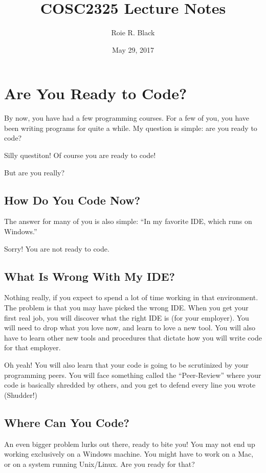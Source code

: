 \documentclass[letterpaper,11pt,english]{sphinxmanual}
\title{COSC2325 Lecture Notes}
\date{May 29, 2017}
\author{Roie R. Black}
\begin{document}
\maketitle
\sphinxtableofcontents
{}\label{\detokenize{index::doc}}



\chapter{Are You Ready to Code?}
\label{\detokenize{01_introduction/are-you-ready-to-code::doc}}
By now, you have had a few programming courses. For a few of you, you have
been writing programs for quite a while. My question is simple: are you ready
to code?

Silly questiton! Of course you are ready to code!

But are you really?


\section{How Do You Code Now?}
\label{\detokenize{01_introduction/are-you-ready-to-code:how-do-you-code-now}}
The answer for many of you is also simple: “In my favorite IDE, which runs on
Windows.”

Sorry! You are not ready to code.


\section{What Is Wrong With My IDE?}
\label{\detokenize{01_introduction/are-you-ready-to-code:what-is-wrong-with-my-ide}}
Nothing really, if you expect to spend a lot of time working in that
environment. The problem is that you may have picked the wrong IDE. When you
get your first real job, you will discover what the right IDE is (for your
employer). You will need to drop what you love now, and learn to love a new
tool. You will also have to learn other new tools and procedures that dictate
how you will write code for that employer.

Oh yeah! You will also learn that your code is going to be scrutinized by your
programming peers. You will face something called the “Peer-Review” where your
code is basically shredded by others, and you get to defend every line you
wrote (Shudder!)


\section{Where Can You Code?}
\label{\detokenize{01_introduction/are-you-ready-to-code:where-can-you-code}}
An even bigger problem lurks out there, ready to bite you! You may not end up
working exclusively on a Windows machine. You might have to work on a Mac, or
on a system running Unix/Linux. Are you ready for that?
\end{document}

